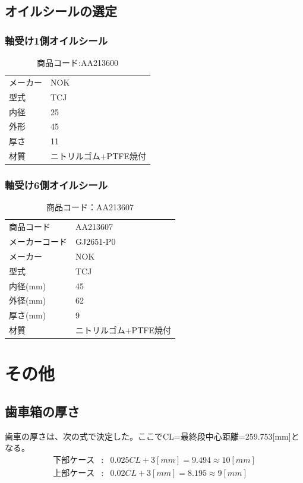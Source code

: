 \documentclass[a4j,twoside,openright,11pt]{jreport}
\begin{document}
\section{オイルシールの選定}
\subsection{軸受け1側オイルシール}
\begin{table}[htb]
\begin{center}
  \caption{商品コード:AA213600}
  \begin{tabular}{ll}
    \hline
    メーカー&NOK\\
    型式&TCJ\\
    内径&25\\
    外形&45\\
    厚さ&11\\
    材質&ニトリルゴム+PTFE焼付\\
    \hline
  \end{tabular}
\end{center}
\end{table}
\subsection{軸受け6側オイルシール}
\begin{table}[htb]
\begin{center}
  \caption{商品コード：AA213607}
  \begin{tabular}{ll}
    \hline
    商品コード&AA213607\\
    メーカーコード&GJ2651-P0\\
    メーカー&NOK\\
    型式&TCJ\\
    内径(mm)&45
    \\外径(mm)&62
    \\厚さ(mm)&9\\
    材質&ニトリルゴム+PTFE焼付\\
    \hline
  \end{tabular}
\end{center}
\end{table}

\chapter{その他}
\section{歯車箱の厚さ}
歯車の厚さは、次の式で決定した。ここでCL=最終段中心距離=259.753[mm]となる。
\begin{eqnarray}
下部ケース&:&0.025CL + 3[mm] = 9.494 \approx 10[mm]\\
上部ケース&:&0.02CL + 3[mm] = 8.195 \approx 9[mm]
\end{eqnarray}
\end{document}
